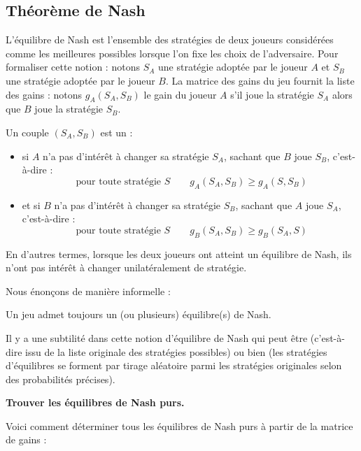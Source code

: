 \documentclass[11pt,class=report,crop=false]{standalone}
\begin{document}
\subsection{Théorème de Nash}

L'équilibre de Nash est l'ensemble des stratégies de deux joueurs considérées comme les meilleures possibles lorsque l'on fixe les choix de l'adversaire.
Pour formaliser cette notion : notons $S_A$ une stratégie adoptée par le joueur $A$ et $S_B$ une stratégie adoptée par le joueur $B$.
La matrice des gains du jeu fournit la liste des gains : notons $g_A(S_A, S_B)$ le gain du joueur $A$ s'il joue la stratégie $S_A$ alors que $B$ joue la stratégie $S_B$.



\begin{definition}
Un couple $(S_A, S_B)$ est un  :
\begin{itemize}
	\item si $A$ n'a pas d'intérêt à changer sa stratégie $S_A$, sachant que $B$ joue $S_B$, c'est-à-dire :
	$$\text{ pour toute stratégie } S \qquad g_A(S_A, S_B) \ge g_A(S, S_B)$$
	
	\item et si $B$ n'a pas d'intérêt à changer sa stratégie $S_B$, sachant que $A$ joue $S_A$, c'est-à-dire :
$$\text{ pour toute stratégie } S \qquad g_B(S_A, S_B) \ge g_B(S_A, S)$$	
\end{itemize}	
\end{definition}

En d'autres termes, lorsque les deux joueurs ont atteint un équilibre de Nash, ils n'ont pas intérêt à changer unilatéralement de stratégie.

Nous énonçons de manière informelle :
\begin{theoreme}
	Un jeu admet toujours un (ou plusieurs) équilibre(s) de Nash.
\end{theoreme}

Il y a une subtilité dans cette notion d'équilibre de Nash qui peut être  (c'est-à-dire issu de la liste originale des stratégies possibles) ou bien  (les stratégies d'équilibres se forment par tirage aléatoire parmi les stratégies originales selon des probabilités précises).

\bigskip
\textbf{Trouver les équilibres de Nash purs.}

Voici comment déterminer tous les équilibres de Nash purs à partir de la matrice de gains :
\end{document}
